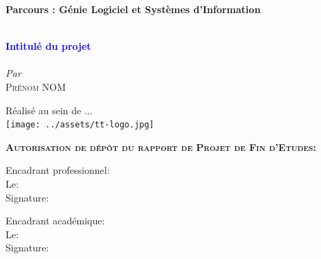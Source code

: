 \begin{titlepage}
\textbf{Parcours : Génie Logiciel et Systèmes d'Information}

\vskip1cm%


\HRule \\[0.4cm]
\textcolor{blue}{ \LARGE \bfseries Intitulé du projet}\\[0.4cm] %
\HRule \\[1cm]

\vskip0.5cm%
\textit{Par}\\
\textsc{\large Prénom NOM}\\[0.5cm] %
\vskip0.5cm%

{Réalisé au sein de ...}\\
\texttt{[image: ../assets/tt-logo.jpg]}\\

\vskip1cm
 


 \begin{flushleft}
\textbf{\textsc{Autorisation de dépôt du rapport de Projet de Fin d'Etudes:}}\\[0.5cm] %
\vskip0.5cm
\begin{minipage}[c]{0.3\columnwidth}
Encadrant professionnel:\\
\vskip0.5cm
Le:\\
\vskip0.5cm
Signature:\\

\end{minipage}
\hfill
\begin{minipage}[c]{0.4\columnwidth}
Encadrant académique:\\
\vskip0.5cm
Le:\\
\vskip0.5cm
Signature:\\
\end{minipage}

 \end{flushleft}




\vfill %

\end{titlepage}
%